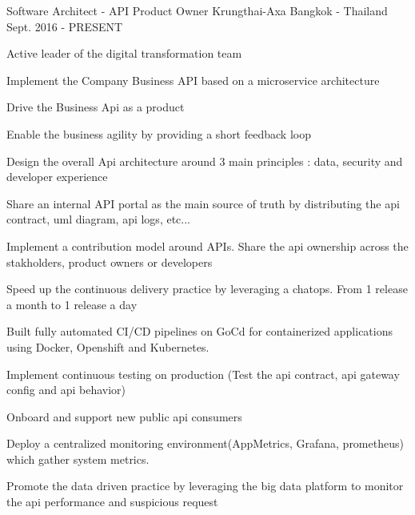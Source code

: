 

\begin{cventries}

  \cventry
    {Software Architect - API Product Owner} %
    {Krungthai-Axa} %
    {Bangkok - Thailand} %
    {Sept. 2016 - PRESENT} %
    {
      \begin{cvitems} %
        \item {Active leader of the digital transformation team}
        \item {Implement the Company Business API based on a microservice architecture}
        \item {Drive the Business Api as a product}
        \item {Enable the business agility by providing a short feedback loop}
        \item {Design the overall Api architecture around 3 main principles : data, security and developer experience}
        \item {Share an internal API portal as the main source of truth by distributing the api contract, uml diagram, api logs, etc...}
        \item {Implement a contribution model around APIs. Share the api ownership across the stakholders, product owners or developers}
        \item {Speed up the continuous delivery practice by leveraging a chatops. From 1 release a month to 1 release a day}
        \item {Built fully automated CI/CD pipelines on GoCd for containerized applications using Docker, Openshift and Kubernetes.}
        \item {Implement continuous testing on production (Test the api contract, api gateway config and api behavior)}
        \item {Onboard and support new public api consumers}
        \item {Deploy a centralized monitoring environment(AppMetrics, Grafana, prometheus) which gather system metrics.}
        \item {Promote the data driven practice by leveraging the big data platform to monitor the api performance and suspicious request}

\end{cvitems}}
\end{cventries}
